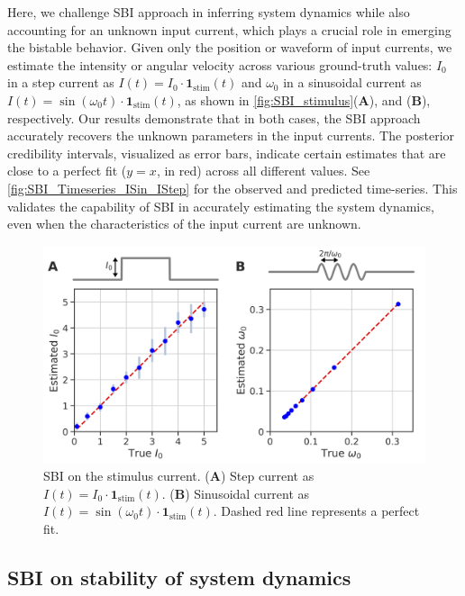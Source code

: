 \documentclass[preprint,11pt,authoryear]{elsarticle}
\begin{document}
Here, we challenge SBI approach in inferring system dynamics while also accounting for an unknown input current, which plays a crucial role in emerging the bistable behavior. Given only the position or waveform of input currents, we estimate the intensity or angular velocity across various ground-truth values: $I_0$ in a step current as $I(t)=I_0 \cdot \mathbf{1}_{\text{stim}}(t)$ and $\omega_0$ in a sinusoidal current as $I(t)=\sin (\omega_0 t) \cdot \mathbf{1}_{\text{stim}}(t)$, as shown in \autoref{fig:SBI_stimulus}(\textbf{A}), and (\textbf{B}), respectively. 
Our results demonstrate that in both cases, the SBI approach accurately recovers the unknown parameters in the input currents. The posterior credibility intervals, visualized as error bars, indicate certain estimates that are close to a perfect fit ($y=x$, in red) across all different values. See \autoref{fig:SBI_Timeseries_ISin_IStep} for the observed and predicted time-series. This validates the capability of SBI in accurately estimating the system dynamics, even when the characteristics of the input current are unknown.


\begin{figure}
    \centering
    \includegraphics[width=0.9\linewidth]{Figs/Fig7.png}
    \caption{SBI on the stimulus current. (\textbf{A}) Step current as $I(t)=I_0 \cdot \mathbf{1}_{\text{stim}}(t)$. (\textbf{B}) Sinusoidal current as $I(t)=\sin (\omega_0 t) \cdot \mathbf{1}_{\text{stim}}(t)$. Dashed red line represents a perfect fit.  }
    \label{fig:SBI_stimulus}
\end{figure}



\subsection{SBI on stability of system dynamics}
\end{document}
